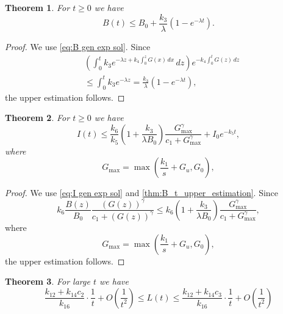 \documentclass[pdflatex,sn-mathphys-num]{sn-jnl}
\theoremstyle{thmstyleone}
\newtheorem{theorem}{Theorem}[section]
\theoremstyle{thmstyletwo}
\theoremstyle{thmstylethree}
\begin{document}
\begin{theorem}\label{thm:B_t_upper_estimation}
For $t\geq 0$ we have
\begin{equation*}
B(t)\leq B_0+\frac{k_3}{\lambda}
\left(1 -e^{-\lambda t}\right).
\end{equation*} 
\end{theorem}

\begin{proof}
We use \eqref{eq:B gen exp sol}. 
Since 
\begin{align*}
&\left(
\int_0^t k_3 e^{-\lambda z +k_4 \int_0^z G(x)\,dx}
\,dz
\right)e^{-k_4 \int_0^t G(z)\,dz} \\
&\leq \int_0^t k_3 e^{-\lambda z}=\frac{k_3}{\lambda}
\left(1 -e^{-\lambda t}\right), 
\end{align*}
the upper estimation follows.
\end{proof}

\begin{theorem}
For $t\geq 0$ we have
\begin{equation}
I(t)\leq  \frac{k_6}{k_5}\left(1+\frac{k_3}{\lambda B_0} \right)
\frac{G_{\max}^{\gamma}}{c_1+G_{\max}^{\gamma}}
+I_0e^{-k_5 t},
\end{equation} 
where
\begin{equation*}
G_{\max}=\max\left(\frac{k_1}{s}+G_u,G_0 \right),
\end{equation*}
\end{theorem}

\begin{proof}
We use \eqref{eq:I gen exp sol} and \autoref{thm:B_t_upper_estimation}. Since 
\begin{equation*}
k_6\frac{B(z)}{B_0}
\frac{(G(z))^{\gamma}}{c_1+(G(z))^{\gamma}}\leq 
k_6\left(1+\frac{k_3}{\lambda B_0} \right)
\frac{G_{\max}^{\gamma}}{c_1+G_{\max}^{\gamma}},
\end{equation*}
where
\begin{equation*}
G_{\max}=\max\left(\frac{k_1}{s}+G_u,G_0 \right),
\end{equation*}
the upper estimation follows.
\end{proof}

\begin{theorem}\label{thm:L_t_estimation}
For large $t$ we have 
\begin{equation}
\frac{k_{12}+k_{14}c_2}{k_{16}}\cdot\frac{1}{t}+O\left(\frac{1}{t^2} \right)\leq 
L(t)\leq \frac{k_{12}+k_{14}c_3}{k_{16}}\cdot\frac{1}{t}+O\left(\frac{1}{t^2} \right)
\end{equation}
\end{theorem}
\end{document}
